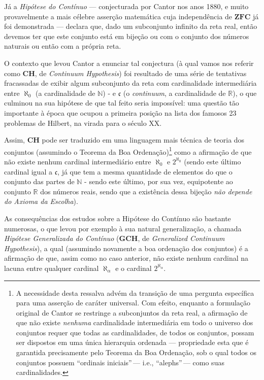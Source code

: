 \documentclass{hipatia}
\newcommand{\N}{\mathbb{N}}
\newcommand{\R}{\mathbb{R}}
\newcommand{\ch}{\mathbf{CH}}
\newcommand{\gch}{\mathbf{GCH}}
\newcommand{\continuum}{\mathfrak{c}}
\newcommand{\zfc}{\mathbf{ZFC}}
\begin{document}
Já a {\it Hipótese do Contínuo} --- conjecturada por Cantor
nos anos 1880, e muito provavelmente a mais célebre asserção
matemática cuja independência de $\zfc$ já foi demonstrada
--- declara que, dado um subconjunto infinito da reta real,
então devemos ter que este conjunto está em bijeção ou com o
conjunto dos números naturais ou então com a própria reta.

O contexto que levou Cantor a enunciar tal conjectura (à
qual vamos nos referir como $\ch$, de {\it Continuum
Hypothesis}) foi resultado de uma série de tentativas
fracassadas de exibir algum subconjunto da reta com
cardinalidade intermediária entre $\aleph_0$ (a
cardinalidade de $\N$) - e $\continuum$ (o {\it continuum},
a cardinalidade de $\R$), o que culminou na sua hipótese de
que tal feito seria impossível: uma questão tão importante à
época que ocupou a primeira posição na lista dos famosos 23
problemas de Hilbert, na virada para o século XX.

Assim, $\ch$ pode ser traduzido em uma linguagem mais técnica de teoria dos
conjuntos 
(assumindo o Teorema da Boa Ordenação)\footnote{A necessidade desta ressalva advém da transição de uma pergunta específica para uma asserção de caráter universal. Com efeito, enquanto a formulação original de Cantor se restringe a subconjuntos da reta real, a afirmação de que não existe \textit{nenhuma} cardinalidade intermediária em todo o universo dos conjuntos requer que todas as cardinalidades, de todos os conjuntos, possam ser dispostos em uma única hierarquia ordenada --- propriedade esta que é garantida precisamente pelo Teorema da Boa Ordenação, sob o qual todos os conjuntos possuem ``ordinais iniciais''\,---  i.e., ``alephs''\,--- como suas cardinalidades.}
como a
afirmação de que não existe nenhum cardinal intermediário
entre $\aleph_0$ e $2^{\aleph_0}$ (sendo este último
cardinal igual a $\continuum$, já que tem a mesma quantidade
de elementos do que o conjunto das partes de $\N$ - sendo
este último, por sua vez, equipotente ao conjunto
$\mathbb{R}$ dos números reais,  sendo que a existência dessa
bijeção {\it não depende do Axioma da Escolha}).

As consequências dos estudos sobre a Hipótese do Contínuo
são bastante numerosas, o que levou por exemplo à sua
natural generalização, a chamada {\it Hipótese Generalizada
do Contínuo} ($\gch$, de {\it Generalized Continuum
Hypothesis}), a qual (assumindo novamente a boa ordenação dos
conjuntos) é a afirmação de que, assim como no caso
anterior, não existe nenhum cardinal na lacuna entre qualquer cardinal
$\aleph_\alpha$ e o cardinal $2^{\aleph_\alpha}$.
\end{document}
